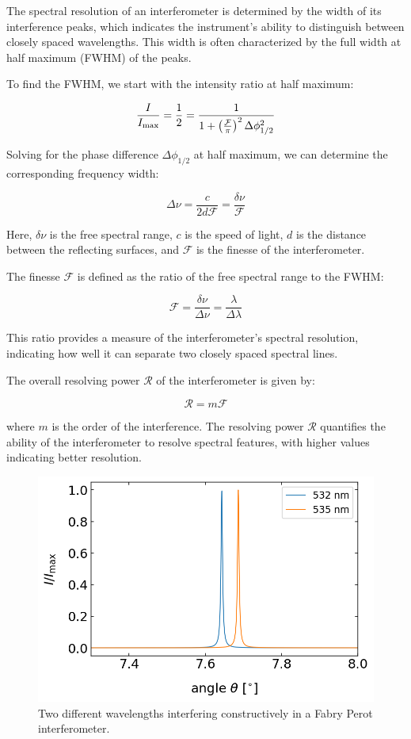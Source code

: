 \documentclass[
  a4paper,
]{book}
\begin{document}
The spectral resolution of an interferometer is determined by the width
of its interference peaks, which indicates the instrument's ability to
distinguish between closely spaced wavelengths. This width is often
characterized by the full width at half maximum (FWHM) of the peaks.

To find the FWHM, we start with the intensity ratio at half maximum:

\[
\frac{I}{I_{\rm max}} = \frac{1}{2} = \frac{1}{1 + \left( \frac{\mathcal{F}}{\pi} \right)^2 \Delta \phi_{1/2}^2 }
\]

Solving for the phase difference \(\Delta \phi_{1/2}\) at half maximum,
we can determine the corresponding frequency width:

\[
\Delta \nu = \frac{c}{2d \mathcal{F}} = \frac{\delta \nu}{\mathcal{F}}
\]

Here, \(\delta \nu\) is the free spectral range, \(c\) is the speed of
light, \(d\) is the distance between the reflecting surfaces, and
\(\mathcal{F}\) is the finesse of the interferometer.

The finesse \(\mathcal{F}\) is defined as the ratio of the free spectral
range to the FWHM:

\[
\mathcal{F} = \frac{\delta \nu}{\Delta \nu} = \frac{\lambda}{\Delta \lambda}
\]

This ratio provides a measure of the interferometer's spectral
resolution, indicating how well it can separate two closely spaced
spectral lines.

The overall resolving power \(\mathcal{R}\) of the interferometer is
given by:

\[
\mathcal{R} = m \mathcal{F}
\]

where \(m\) is the order of the interference. The resolving power
\(\mathcal{R}\) quantifies the ability of the interferometer to resolve
spectral features, with higher values indicating better resolution.

\begin{figure}[H]

{\centering \includegraphics[width=0.6\linewidth,height=\textheight,keepaspectratio]{wave-optics/img/perot_spectral.png}

}

\caption{Two different wavelengths interfering constructively in a Fabry
Perot interferometer.}

\end{figure}%
\end{document}
